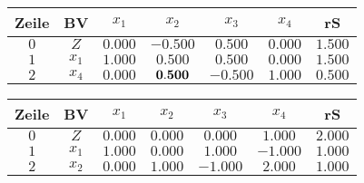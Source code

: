 \documentclass[a4paper]{article}
\begin{document}
\begin{tabular}{|c|c|cc|cc|c|} \hline
Zeile & BV & $x_1$ &$x_2$ &$x_3$ &$x_4$ & rS \\ \hline
$0$ & $Z$ & $0.000$ &$-0.500$ &$0.500$ &$0.000$ & $1.500$ \\ \hline
$1$ & $x_1$ & $1.000$ &$0.500$ &$0.500$ &$0.000$ & $1.500$ \\ 
$2$ & $x_4$ & $0.000$ &$\bf 0.500$ &$-0.500$ &$1.000$ & $0.500$ \\ 
\hline\end{tabular}

\begin{tabular}{|c|c|cc|cc|c|} \hline
Zeile & BV & $x_1$ &$x_2$ &$x_3$ &$x_4$ & rS \\ \hline
$0$ & $Z$ & $0.000$ &$0.000$ &$0.000$ &$1.000$ & $2.000$ \\ \hline
$1$ & $x_1$ & $1.000$ &$0.000$ &$1.000$ &$-1.000$ & $1.000$ \\ 
$2$ & $x_2$ & $0.000$ &$1.000$ &$-1.000$ &$2.000$ & $1.000$ \\ 
\hline\end{tabular}
\end{document}
